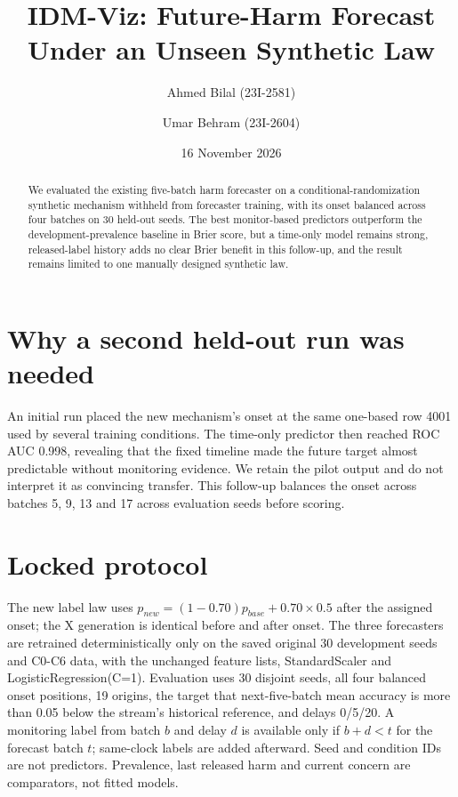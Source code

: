 \documentclass[10pt,a4paper]{article}
\title{IDM-Viz: Future-Harm Forecast Under an Unseen Synthetic Law}
\author{Ahmed Bilal (23I-2581) \and Umar Behram (23I-2604)}\date{16 November 2026}
\begin{document}
\maketitle
\begin{abstract}
We evaluated the existing five-batch harm forecaster on a conditional-randomization synthetic mechanism withheld from forecaster training, with its onset balanced across four batches on 30 held-out seeds. The best monitor-based predictors outperform the development-prevalence baseline in Brier score, but a time-only model remains strong, released-label history adds no clear Brier benefit in this follow-up, and the result remains limited to one manually designed synthetic law.
\end{abstract}
\section{Why a second held-out run was needed}
An initial run placed the new mechanism's onset at the same one-based row 4001 used by several training conditions. The time-only predictor then reached ROC AUC 0.998, revealing that the fixed timeline made the future target almost predictable without monitoring evidence. We retain the pilot output and do not interpret it as convincing transfer. This follow-up balances the onset across batches 5, 9, 13 and 17 across evaluation seeds before scoring.
\section{Locked protocol}
The new label law uses $p_{new}=(1-0.70)p_{base}+0.70\times0.5$ after the assigned onset; the X generation is identical before and after onset. The three forecasters are retrained deterministically only on the saved original 30 development seeds and C0-C6 data, with the unchanged feature lists, StandardScaler and LogisticRegression(C=1). Evaluation uses 30 disjoint seeds, all four balanced onset positions, 19 origins, the target that next-five-batch mean accuracy is more than 0.05 below the stream's historical reference, and delays 0/5/20. A monitoring label from batch $b$ and delay $d$ is available only if $b+d<t$ for the forecast batch $t$; same-clock labels are added afterward. Seed and condition IDs are not predictors. Prevalence, last released harm and current concern are comparators, not fitted models.
\end{document}
